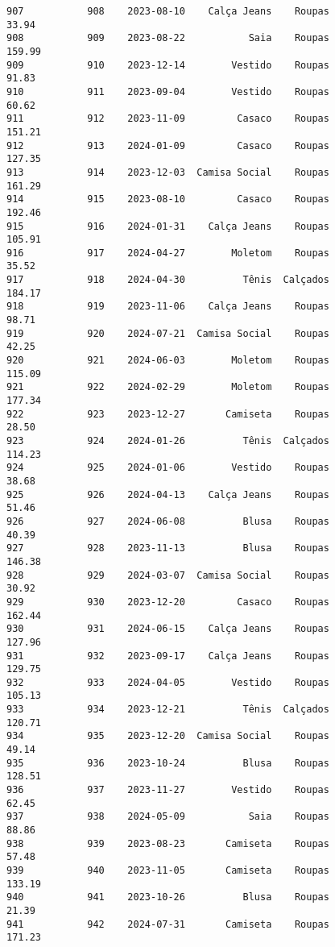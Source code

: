 \documentclass[11pt]{article}
\begin{document}
\begin{Verbatim}[commandchars=\\\{\}]
907           908    2023-08-10    Calça Jeans    Roupas           33.94   
908           909    2023-08-22           Saia    Roupas          159.99   
909           910    2023-12-14        Vestido    Roupas           91.83   
910           911    2023-09-04        Vestido    Roupas           60.62   
911           912    2023-11-09         Casaco    Roupas          151.21   
912           913    2024-01-09         Casaco    Roupas          127.35   
913           914    2023-12-03  Camisa Social    Roupas          161.29   
914           915    2023-08-10         Casaco    Roupas          192.46   
915           916    2024-01-31    Calça Jeans    Roupas          105.91   
916           917    2024-04-27        Moletom    Roupas           35.52   
917           918    2024-04-30          Tênis  Calçados          184.17   
918           919    2023-11-06    Calça Jeans    Roupas           98.71   
919           920    2024-07-21  Camisa Social    Roupas           42.25   
920           921    2024-06-03        Moletom    Roupas          115.09   
921           922    2024-02-29        Moletom    Roupas          177.34   
922           923    2023-12-27       Camiseta    Roupas           28.50   
923           924    2024-01-26          Tênis  Calçados          114.23   
924           925    2024-01-06        Vestido    Roupas           38.68   
925           926    2024-04-13    Calça Jeans    Roupas           51.46   
926           927    2024-06-08          Blusa    Roupas           40.39   
927           928    2023-11-13          Blusa    Roupas          146.38   
928           929    2024-03-07  Camisa Social    Roupas           30.92   
929           930    2023-12-20         Casaco    Roupas          162.44   
930           931    2024-06-15    Calça Jeans    Roupas          127.96   
931           932    2023-09-17    Calça Jeans    Roupas          129.75   
932           933    2024-04-05        Vestido    Roupas          105.13   
933           934    2023-12-21          Tênis  Calçados          120.71   
934           935    2023-12-20  Camisa Social    Roupas           49.14   
935           936    2023-10-24          Blusa    Roupas          128.51   
936           937    2023-11-27        Vestido    Roupas           62.45   
937           938    2024-05-09           Saia    Roupas           88.86   
938           939    2023-08-23       Camiseta    Roupas           57.48   
939           940    2023-11-05       Camiseta    Roupas          133.19   
940           941    2023-10-26          Blusa    Roupas           21.39   
941           942    2024-07-31       Camiseta    Roupas          171.23   

\end{Verbatim}
\end{document}
